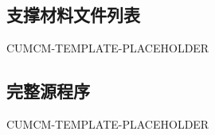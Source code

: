 \subsection*{支撑材料文件列表}

CUMCM-TEMPLATE-PLACEHOLDER

\subsection*{完整源程序}

CUMCM-TEMPLATE-PLACEHOLDER
